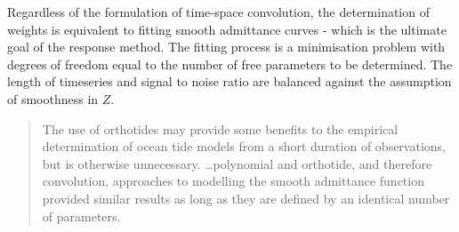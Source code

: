 Regardless of the formulation of time-space convolution, the determination of weights is equivalent to fitting smooth admittance curves - which is the ultimate goal of the response method.  The fitting process is a minimisation problem with degrees of freedom equal to the number of free parameters to be determined.    The length of timeseries and signal to noise ratio are balanced against the assumption of smoothness in $Z$.
\begin{quotation}   
The use of orthotides may provide some benefits to the empirical determination of ocean tide models from a short duration of observations, but is otherwise unnecessary. \dots  polynomial and orthotide, and therefore convolution, approaches to modelling the smooth admittance function provided similar results as long as they are defined by an identical number of parameters.\citep{Desai:2006wo}
\end{quotation}
